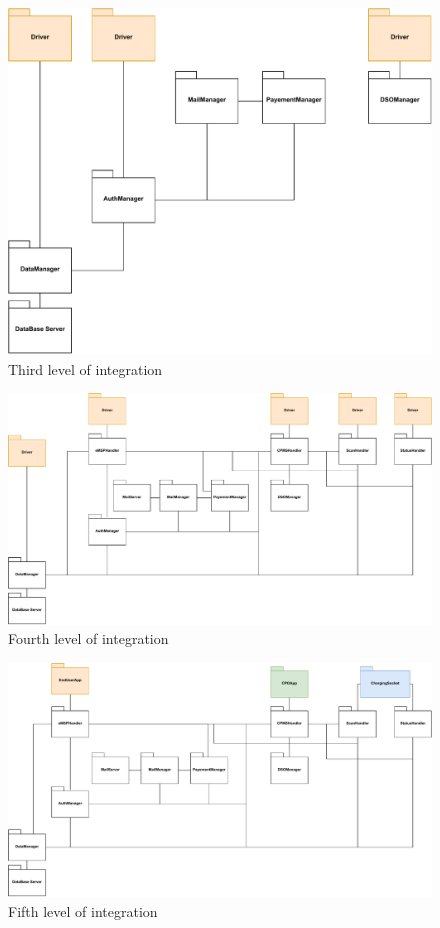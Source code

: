 \begin{figure}[H]
    \centering
    \includegraphics[width=\textwidth]{images/3.pdf}
    \caption{Third level of integration}
    \label{fig:1}
\end{figure}
\begin{figure}[H]
    \centering
    \includegraphics[width=\textwidth]{images/4.pdf}
    \caption{Fourth level of integration}
    \label{fig:1}
\end{figure}
\begin{figure}[H]
    \centering
    \includegraphics[width=\textwidth]{images/5.pdf}
    \caption{Fifth level of integration}
    \label{fig:1}
\end{figure}
